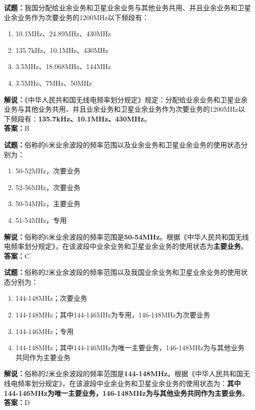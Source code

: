 \documentclass{ctexbook}
\begin{document}
\noindent\textbf{试题：}我国分配给业余业务和卫星业余业务与其他业务共用、并且业余业务和卫星业余业务作为次要业务的1200\unit{\MHz}以下频段有：
\begin{enumerate}[leftmargin=3em]
  \item 10.1\unit{\MHz}、24.89\unit{\MHz}、430\unit{\MHz}
  \item 135.7\unit{\kHz}、10.1\unit{\MHz}、430\unit{\MHz}
  \item 3.5\unit{\MHz}、18.068\unit{\MHz}、144\unit{\MHz}
  \item 3.5\unit{\MHz}、7\unit{\MHz}、50\unit{\MHz}
\end{enumerate}
\noindent\textbf{解说：}《中华人民共和国无线电频率划分规定》规定：分配给业余业务和卫星业余业务与其他业务共用、并且业余业务和卫星业余业务作为次要业务的1200\unit{\MHz}以下频段有：\textbf{135.7\unit{\kHz}、10.1\unit{\MHz}、430\unit{\MHz}}。\\\noindent\textbf{答案：}B

\vspace{\baselineskip}

\noindent\textbf{试题：}俗称的6米业余波段的频率范围以及业余业务和卫星业余业务的使用状态分别为：
\begin{enumerate}[leftmargin=3em]
  \item 50-52\unit{\MHz}，次要业务
  \item 52-56\unit{\MHz}，次要业务
  \item 50-54\unit{\MHz}，主要业务
  \item 51-54\unit{\MHz}，专用
\end{enumerate}
\noindent\textbf{解说：}俗称的6米业余波段的频率范围是\textbf{50-54\unit{\MHz}}。根据《中华人民共和国无线电频率划分规定》，在该波段中业余业务和卫星业余业务的使用状态为\textbf{主要业务}。\\\noindent\textbf{答案：}C

\vspace{\baselineskip}

\noindent\textbf{试题：}俗称的2米业余波段的频率范围以及我国业余业务和卫星业余业务的使用状态分别为：
\begin{enumerate}[leftmargin=3em]
  \item 144-148\unit{\MHz}；次要业务
  \item 144-148\unit{\MHz}；其中144-146\unit{\MHz}为专用，146-148\unit{\MHz}为次要业务
  \item 144-146\unit{\MHz}；专用
  \item 144-148\unit{\MHz}；其中144-146\unit{\MHz}为唯一主要业务，146-148\unit{\MHz}为与其他业务共同作为主要业务
\end{enumerate}
\noindent\textbf{解说：}俗称的2米业余波段的频率范围是\textbf{144-148\unit{\MHz}}。根据《中华人民共和国无线电频率划分规定》，在该波段中业余业务和卫星业余业务的使用状态为：\textbf{其中144-146\unit{\MHz}为唯一主要业务，146-148\unit{\MHz}为与其他业务共同作为主要业务}。\\\noindent\textbf{答案：}D
\vspace{\baselineskip}
\end{document}

